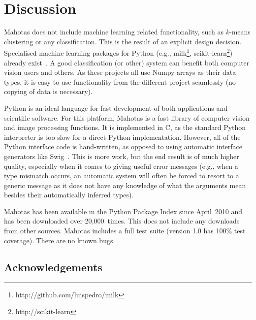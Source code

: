 \documentclass{article}
\newcommand*{\cpp}{{C\nolinebreak[4]\hspace{-.05em}\raisebox{.4ex}{\tiny\textbf{++}}}}
\begin{document}
\section{Discussion}

Mahotas does not include machine learning related functionality, such as
$k$-means clustering or any classification. This is the result of an explicit
design decision. Specialised machine learning packages for Python (e.g.,
milk\footnote{http://github.com/luispedro/milk},
scikit-learn\footnote{http://scikit-learn}) already
exist~\citep{Pedregosa:2011:SML:2078183.2078195}. A good classification (or
other) system can benefit both computer vision users and others. As these
projects all use Numpy arrays as their data types, it is easy to use
functionality from the different project seamlessly (no copying of data is
necessary).

Python is an ideal language for fast development of both applications and
scientific software. For this platform, Mahotas is a fast library of computer
vision and image processing functions. It is implemented in \cpp{}, as the
standard Python interpreter is too slow for a direct Python implementation.
However, all of the Python interface code is hand-written, as opposed to using
automatic interface generators like Swig~\cite{Beazley2003599}. This is more
work, but the end result is of much higher quality, especially when it comes to
giving useful error messages (e.g., when a type mismatch occurs, an automatic
system will often be forced to resort to a generic message as it does not have
any knowledge of what the arguments mean besides their automatically inferred
types).

Mahotas has been available in the Python Package Index since April~2010 and has
been downloaded over 20,000~times. This does not include any downloads from
other sources. Mahotas includes a full test suite (version 1.0 has 100\% test
coverage). There are no known bugs.

\subsection*{Acknowledgements}
\end{document}
